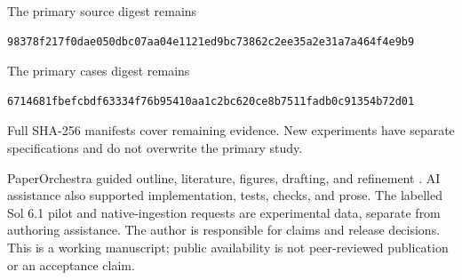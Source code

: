 \documentclass[10pt,letterpaper]{article}
\begin{document}
The primary source digest remains
\begin{verbatim}
98378f217f0dae050dbc07aa04e1121ed9bc73862c2ee35a2e31a7a464f4e9b9
\end{verbatim}
The primary cases digest remains
\begin{verbatim}
6714681fbefcbdf63334f76b95410aa1c2bc620ce8b7511fadb0c91354b72d01
\end{verbatim}
Full SHA-256 manifests cover remaining evidence. New experiments have separate specifications and do not overwrite the primary study.

PaperOrchestra guided outline, literature, figures, drafting, and refinement \cite{song2026paperorchestra}. AI assistance also supported implementation, tests, checks, and prose. The labelled Sol 6.1 pilot and native-ingestion requests are experimental data, separate from authoring assistance. The author is responsible for claims and release decisions. This is a working manuscript; public availability is not peer-reviewed publication or an acceptance claim.
\end{document}
